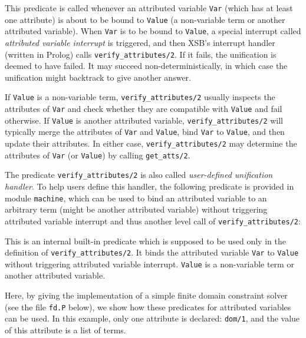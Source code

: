 
This predicate is called whenever an attributed variable \texttt{Var}
(which has at least one attribute) is about to be bound to
\texttt{Value} (a non-variable term or another attributed variable).
When \texttt{Var} is to be bound to \texttt{Value}, a special interrupt
called \emph{attributed variable interrupt} is triggered, and then XSB's
interrupt handler (written in Prolog) calls
\texttt{verify\_attributes/2}.  If it fails, the unification is deemed
to have failed.  It may succeed non-deterministically, in which case the
unification might backtrack to give another answer.

If \texttt{Value} is a non-variable term, \texttt{verify\_attributes/2}
usually inspects the attributes of \texttt{Var} and check whether they
are compatible with \texttt{Value} and fail otherwise.  If
\texttt{Value} is another attributed variable,
\texttt{verify\_attributes/2} will typically merge the attributes of
\texttt{Var} and \texttt{Value}, bind \texttt{Var} to \texttt{Value},
and then update their attributes.  In either case,
\texttt{verify\_attributes/2} may determine the attributes of
\texttt{Var} (or \texttt{Value}) by calling \texttt{get\_atts/2}.

The predicate \texttt{verify\_attributes/2} is also called
\emph{user-defined unification handler}.  To help users define this
handler, the following predicate is provided in module \texttt{machine},
which can be used to bind an attributed variable to an arbitrary term
(might be another attributed variable) without triggering attributed
variable interrupt and thus another level call of
\texttt{verify\_attributes/2}:

\begin{description}

This is an internal built-in predicate which is supposed to be used only
in the definition of \texttt{verify\_attributes/2}.  It binds the
attributed variable \texttt{Var} to \texttt{Value} without triggering
attributed variable interrupt.  \texttt{Value} is a non-variable term or
another attributed variable.

\end{description}

Here, by giving the implementation of a simple finite domain constraint
solver (see the file \texttt{fd.P} below), we show how these predicates
for attributed variables can be used.  In this example, only one
attribute is declared: \texttt{dom/1}, and the value of this attribute
is a list of terms.

